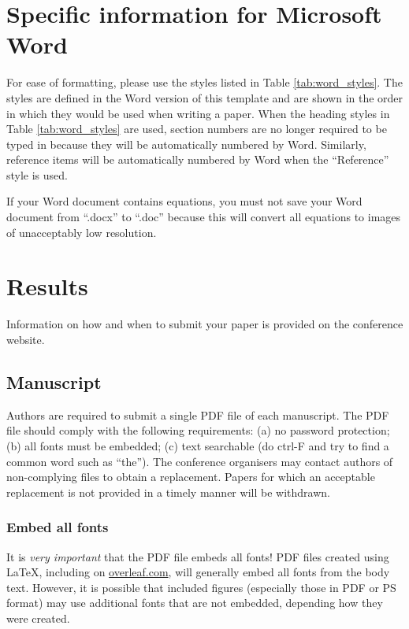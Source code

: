 \documentclass{INTERSPEECH2023}
\begin{document}
\section{Specific information for Microsoft Word}

For ease of formatting, please use the styles listed in Table \ref{tab:word_styles}. The styles are defined in the Word version of this template and are shown in the order in which they would be used when writing a paper. When the heading styles in Table \ref{tab:word_styles} are used, section numbers are no longer required to be typed in because they will be automatically numbered by Word. Similarly, reference items will be automatically numbered by Word when the ``Reference'' style is used.

If your Word document contains equations, you must not save your Word document from ``.docx'' to ``.doc'' because this will convert all equations to images of unacceptably low resolution.

\section{Results}

Information on how and when to submit your paper is provided on the conference website.

\subsection{Manuscript}

Authors are required to submit a single PDF file of each manuscript. The PDF file should comply with the following requirements: (a) no password protection; (b) all fonts must be embedded; (c) text searchable (do ctrl-F and try to find a common word such as ``the''). The conference organisers may contact authors of non-complying files to obtain a replacement. Papers for which an acceptable replacement is not provided in a timely manner will be withdrawn.

\subsubsection{Embed all fonts}

It is \textit{very important} that the PDF file embeds all fonts!  PDF files created using \LaTeX, including on \url{overleaf.com}, will generally embed all fonts from the body text. However, it is possible that included figures (especially those in PDF or PS format) may use additional fonts that are not embedded, depending how they were created. 
\end{document}
